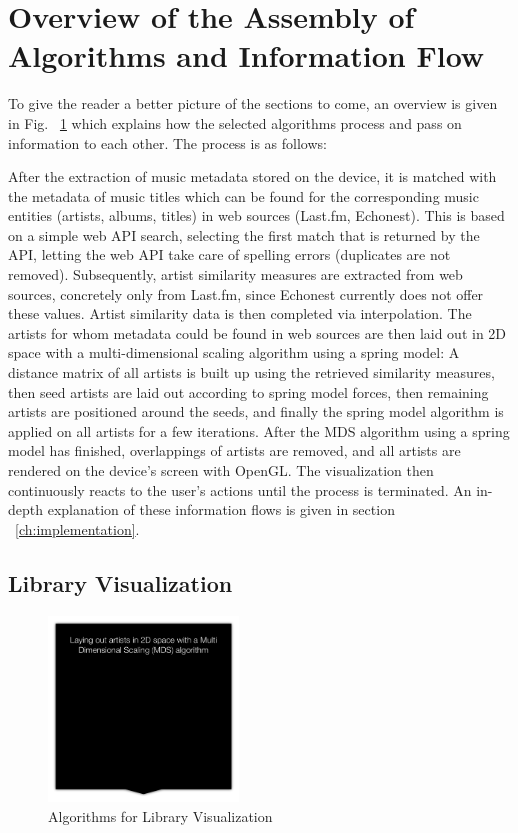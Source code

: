 \section{Overview of the Assembly of Algorithms and Information Flow}

To give the reader a better picture of the sections to come, an overview is given in Fig. ~\ref{fig:algorithm_flow_visualization} which explains how the selected algorithms process and pass on information to each other. The process is as follows:

\indent After the extraction of music metadata stored on the device, it is matched with the metadata of music titles which can be found for the corresponding music entities (artists, albums, titles) in web sources (Last.fm, Echonest). This is based on a simple web API search, selecting the first match that is returned by the API, letting the web API take care of spelling errors (duplicates are not removed). Subsequently, artist similarity measures are extracted from web sources, concretely only from Last.fm, since Echonest currently does not offer these values. Artist similarity data is then completed via interpolation. The artists for whom metadata could be found in web sources are then laid out in 2D space with a multi-dimensional scaling algorithm using a spring model: A distance matrix of all artists is built up using the retrieved similarity measures, then seed artists are laid out according to spring model forces, then remaining artists are positioned around the seeds, and finally the spring model algorithm is applied on all artists for a few iterations. After the MDS algorithm using a spring model has finished, overlappings of artists are removed, and all artists are rendered on the device's screen with OpenGL. The visualization then continuously reacts to the user's actions until the process is terminated.
An in-depth explanation of these information flows is given in section ~\ref{ch:implementation}.

\subsection{Library Visualization}

\begin{figure}[H]
  \centering
    \includegraphics[width=0.45\textwidth]{figures/algorithm_flow_visualization}
  \caption{Algorithms for Library Visualization}
  \label{fig:algorithm_flow_visualization}
\end{figure}

